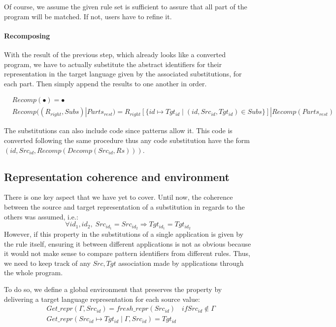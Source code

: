 Of course, we assume the given rule set is sufficient to assure that all part of the
program will be matched. If not, users have to refine it.

\paragraph{Recomposing}
With the result of the previous step, which already looks like a converted program,
we have to actually substitute the abstract identifiers for their representation
in the target language given by the associated substitutions, for each part.
Then simply append the results to one another in order.

\begin{align*}
& Recomp(\bullet) = \bullet\\
& Recomp((R_{right}, Subs) | Parts_{rest}) = R_{right}[\{id \mapsto Tgt_{id} \mid (id,Src_{id},Tgt_{id})\in Subs\}] | Recomp(Parts_{rest})
\end{align*}

\begin{remark}
The substitutions can also include code since patterns allow it. This code is converted following the same
procedure thus any code substitution have the form $(id,Src_{id},Recomp(Decomp(Src_{id},Rs)))$.
\end{remark}

\subsection{Representation coherence and environment}
There is one key aspect that we have yet to cover. Until now, the coherence between the source and target representation of
a substitution in regards to the others was assumed, i.e.:
\begin{equation*}
\forall id_1,id_2, \; Src_{id_1} = Src_{id_2} \Rightarrow Tgt_{id_1} = Tgt_{id_2}
\end{equation*}
However, if this property in the substitutions of a single application is given by the rule itself,
ensuring it between different applications is not as obvious because it would not make sense to
compare pattern identifiers from different rules. Thus, we need to keep track of any $Src,Tgt$
association made by applications through the whole program.

To do so, we define a global environment that preserves the property by delivering a target
language representation for each source value:
\begin{align*}
& Get\_repr(\Gamma,Src_{id}) = fresh\_repr(Src_{id}) & if Src_{id} \notin \Gamma\\
& Get\_repr(Src_{id}\mapsto Tgt_{id}\mid\Gamma,Src_{id}) = Tgt_{id} &
\end{align*}

